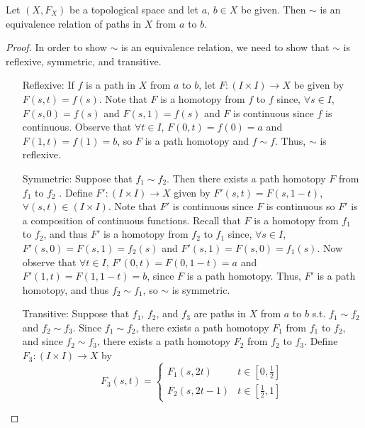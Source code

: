 \begin{theorem} Let $(X, F_X)$ be a topological space and let $a$, $b \in X$ be given. Then $\sim$ is an equivalence relation of paths in $X$ from $a$ to $b$.
\end{theorem}
\begin{proof}
 In order to show $\sim$ is an equivalence relation, we need to show that $\sim$ is reflexive, symmetric, and transitive.
\begin{itemize}
\item[Reflexive:]
If $f$ is a path in $X$ from $a$ to $b$, let $F: (I \times I) \rightarrow X$ be given by $F(s,t) = f(s)$. Note that $F$ is a homotopy from $f$ to $f$ since, $\forall s \in I$, $F(s,0) = f(s)$ and $F(s,1) = f(s)$ and $F$ is continuous since $f$ is continuous. Observe that $\forall t \in I$, $F(0, t) = f(0) = a$ and $F(1, t) = f(1) = b$, so $F$ is a path homotopy and $f \sim f$. Thus, $\sim$ is reflexive.
\item[Symmetric:] Suppose that $f_1 \sim f_2$.  Then there exists a path homotopy $F$ from $f_1$ to $f_2$ . Define $F': (I \times I) \rightarrow X$ given by $F'(s,t) = F(s, 1-t)$, $\forall (s,t) \in (I \times I)$. Note that $F'$ is continuous since $F$ is continuous so $F'$ is a composition of continuous functions. Recall that $F$ is a homotopy from $f_1$ to $f_2$, and thus $F'$ is a homotopy from $f_2$ to $f_1$ since,  $\forall s \in I$, $F'(s, 0) = F(s, 1) = f_2(s)$ and $F'(s, 1) = F(s, 0) = f_1(s)$. Now observe that $\forall t \in I$, $F'(0,t) = F(0,1-t) = a$ and $F'(1,t) = F(1, 1-t) = b$, since $F$ is a path homotopy. Thus, $F'$ is a path homotopy, and thus $f_2 \sim f_1$, so $\sim$ is symmetric.
\item [Transitive:]  Suppose that $f_1$, $f_2$, and $f_3$ are paths in $X$ from $a$ to $b$ s.t. $f_1 \sim f_2$ and $f_2 \sim f_3$.  Since $f_1 \sim f_2$, there exists a path homotopy $F_1$ from $f_1$ to $f_2$, and since $f_2 \sim f_3$, there exists a path homotopy $F_2$ from $f_2$ to $f_3$. Define $F_3: (I \times I) \rightarrow X$ by 
\begin{displaymath}
   F_3(s,t) = \begin{cases}
       F_1(s,2t) & t \in [0, \frac{1}{2}]\\
       F_2(s,2t - 1) & t \in [\frac{1}{2}, 1]
    \end{cases}
\end{displaymath}


\end{itemize}
\end{proof}

